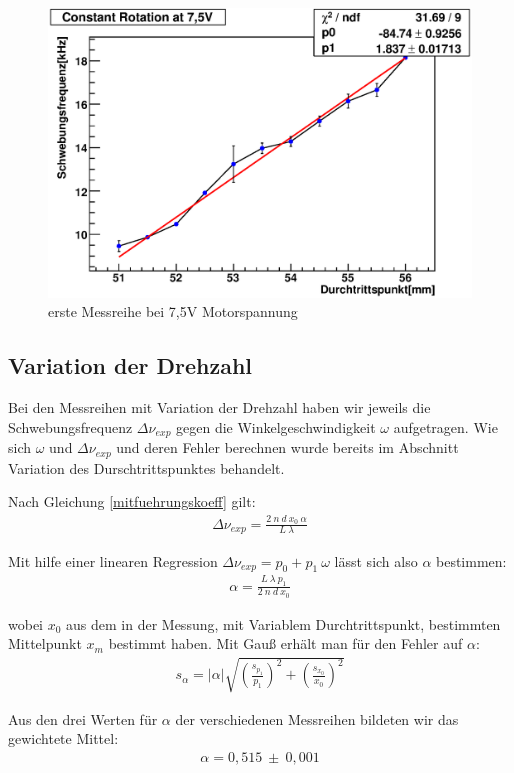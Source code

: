 \documentclass[12pt]{article}
\begin{document}
\begin{figure}[H]  
\centering
\includegraphics[width=0.7\linewidth]{pictures/7,5V1.eps}
\caption{erste Messreihe bei 7,5V Motorspannung}
\end{figure}

\subsection{Variation der Drehzahl}
Bei den Messreihen mit Variation der Drehzahl haben wir jeweils die Schwebungsfrequenz $\Delta\nu_{exp}$ gegen die Winkelgeschwindigkeit $\omega$
aufgetragen. Wie sich $\omega$ und $\Delta\nu_{exp}$ und deren Fehler berechnen wurde bereits im Abschnitt Variation des Durschtrittspunktes behandelt.

Nach Gleichung \ref{mitfuehrungskoeff} gilt:
\begin{align}
 \Delta\nu_{exp} = \frac{2 \ n \ d \ x_0 \ \alpha}{L \ \lambda}
\end{align}

Mit hilfe einer linearen Regression $\Delta\nu_{exp} = p_0 + p_1 \ \omega$ lässt sich also $\alpha$ bestimmen:
\begin{align}
 \alpha = \frac{L \ \lambda \ p_1}{2 \ n \ d \ x_0}
\end{align}

wobei $x_0$ aus dem in der Messung, mit Variablem Durchtrittspunkt, bestimmten Mittelpunkt $x_m$ bestimmt haben.
Mit Gauß erhält man für den Fehler auf $\alpha$:
\begin{align}
 s_{\alpha} = \lvert \alpha \rvert \sqrt{\left(\frac{s_{p_1}}{p_1}\right)^2 + \left(\frac{s_{x_0}}{x_0}\right)^2}
\end{align}

Aus den drei Werten für $\alpha$ der verschiedenen Messreihen bildeten wir das gewichtete Mittel:
\begin{align}
 \alpha = 0,515 \ \pm \ 0,001
\end{align}
\end{document}
